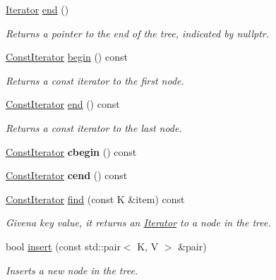 \begin{DoxyCompactItemize}
\mbox{\label{classBST_a7b050d8cffe441618e074e09139db869}} 
\hyperlink{classBST_1_1Iterator}{Iterator} \hyperlink{classBST_a7b050d8cffe441618e074e09139db869}{end} ()
\begin{DoxyCompactList}\small\item\em Returns a pointer to the end of the tree, indicated by nullptr. \end{DoxyCompactList}\item 
\mbox{\label{classBST_ad8c1af62e5b5e0b119179f177633836e}} 
\hyperlink{classBST_1_1ConstIterator}{Const\+Iterator} \hyperlink{classBST_ad8c1af62e5b5e0b119179f177633836e}{begin} () const
\begin{DoxyCompactList}\small\item\em Returns a const iterator to the first node. \end{DoxyCompactList}\item 
\mbox{\label{classBST_a1901ddfeb7c806d46ed363c115049363}} 
\hyperlink{classBST_1_1ConstIterator}{Const\+Iterator} \hyperlink{classBST_a1901ddfeb7c806d46ed363c115049363}{end} () const
\begin{DoxyCompactList}\small\item\em Returns a const iterator to the last node. \end{DoxyCompactList}\item 
\mbox{\label{classBST_a2ca4a971ca3c6239c78a167fff42afe5}} 
\hyperlink{classBST_1_1ConstIterator}{Const\+Iterator} {\bfseries cbegin} () const
\item 
\mbox{\label{classBST_a44b8111ddbf10213f1cf97946cf8cccd}} 
\hyperlink{classBST_1_1ConstIterator}{Const\+Iterator} {\bfseries cend} () const
\item 
\hyperlink{classBST_1_1ConstIterator}{Const\+Iterator} \hyperlink{classBST_a78994b2b2383be06e93f2f3882bbc7e6}{find} (const K \&item) const
\begin{DoxyCompactList}\small\item\em Givena key value, it returns an \hyperlink{classBST_1_1Iterator}{Iterator} to a node in the tree. \end{DoxyCompactList}\item 
bool \hyperlink{classBST_ac149123e8192d8f8d29eee828c3ee74a}{insert} (const std\+::pair$<$ K, V $>$ \&pair)
\begin{DoxyCompactList}\small\item\em Inserts a new node in the tree. \end{DoxyCompactList}\item 

\end{DoxyCompactItemize}
